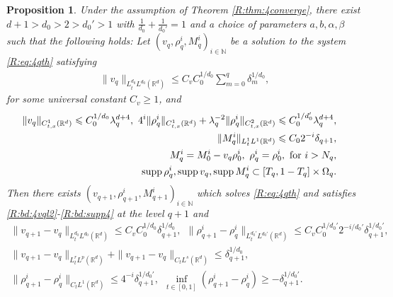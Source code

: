 \documentclass[UTF-8,reqno]{amsart}
\numberwithin{equation}{section}
\newtheorem{proposition}[theorem]{Proposition}
\theoremstyle{definition}
\DeclareMathOperator{\supp}{supp}
\def\mN{{\mathbb N}}
\def\geq{\geqslant}
\def\leq{\leqslant}
\def\bp{\begin{proposition}}
\def\ep{\end{proposition}}
\def\geq{\geqslant}
\def\leq{\leqslant}
\begin{document}
\bp\label{R:prop:case4} 
Under the assumption of Theorem \ref{R:thm:4converge}, there exist $d+1>d_0>2>d_0'>1$ with $\frac{1}{d_0}+\frac{1}{d_0'}=1$ and a choice of parameters $a,b,\alpha,\beta$  such
that the following holds: Let $(v_q,\rho^{i}_q,  M^{i}_q)_{i\in\mN}$ be a solution to the system \eqref{R:eq:4qth} satisfying   
\begin{align}\label{R:bd:4vql2}
\|v_q\|_{L^{d_0}_tL^{d_0}(\mathbb{R}^d)}\leq C_vC_0^{1/d_0}\sum_{m=0}^q\delta_{m}^{1/d_0},
\end{align}
for some universal constant $C_v\geq1$, and
\begin{align}
\|v_q\|_{C_{t,x}^1(\mathbb{R}^d)}\leq C_0^{1/d_0}\lambda_q^{d+4},\
4^{i} \|\rho^{i}_{q}\|_{C_{t,x}^1(\mathbb{R}^d)}+\lambda_q^{-2}\|\rho^{i}_{q}\|_{C_{t,x}^2(\mathbb{R}^d)}\leq C_0^{1/d_0'}\lambda_q^{d+4},
\label{R:bd:4rhoqc1}\\
 \|M^{i}_q\|_{L^1_tL^1(\mathbb{R}^d)}\leq C_02^{-i}\delta_{q+1},&\label{R:bd:4rql1}\\
 M^{i}_{q}=M^{i}_{0}-v_{q}\rho^{i}_0,\ \rho_q^{i}=\rho_0^{i}, \ {\rm for\ }  i>N_{q},\label{R:bd:4mqi>nq}\\
  \supp\rho_q^i,\supp v_q,\supp M_q^i\subset [T_q,1-T_q]\times \Omega_q.&\label{R:bd:supp4}
\end{align}
Then there exists 
$(v_{q+1},\rho^{i}_{q+1},  M^{i}_{q+1})_{i\in\mN}$ which solves \eqref{R:eq:4qth} and satisfies \eqref{R:bd:4vql2}-\eqref{R:bd:supp4} at the level $q+1$ and
\begin{align}
\|v_{q+1}-v_{q}\|_{L^{d_0}_tL^{d_0}(\mathbb{R}^d)}\leq
C_vC_0^{1/d_0}\delta_{q+1}^{1/d_0},\label{R:bd:4vq+1-vqldd}\ \
\|\rho^{i}_{q+1}-\rho^{i}_{q}\|_{L^{d_0'}_tL^{d_0'}(\mathbb{R}^d)}\leq
C_v C_0^{1/{d_0'}}2^{-i/d_0'}\delta_{q+1}^{1/{d_0'}},\\%
\|v_{q+1}-v_{q}\|_{L^{r}_tL^{p}(\mathbb{R}^d)}+\|v_{q+1}-v_q\|_{C_tL^s(\mathbb{R}^d)}\leq
\delta_{q+1}^{1/d_0},\label{R:bd:4vq+1-vqlpr}\\
\|\rho^{i}_{q+1}-\rho^{i}_{q}\|_{C_tL^1(\mathbb{R}^d)}\leq
 4^{-i}\delta_{q+1}^{1/d_0'},\ \  \inf_{t\in [0,1]}(\rho^{i}_{q+1} - \rho^{i}_q)\geq - \delta_{q+1}^{1/d_0'} .\label{R:bd:4rhoq+1-rhoql1}
\end{align}
\ep
 
\end{document}
